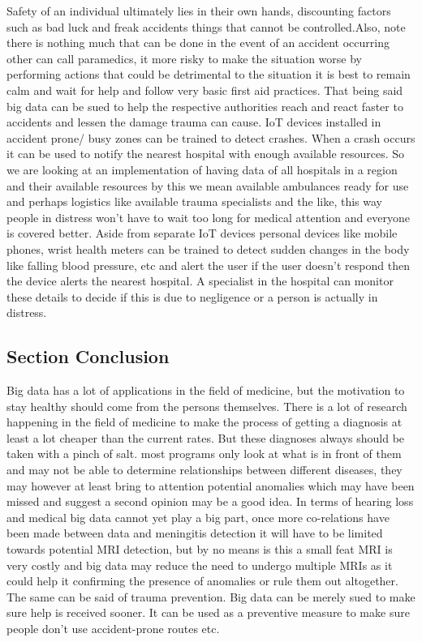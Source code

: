 \documentclass[sigconf]{acmart}
\begin{document}
Safety of an individual ultimately lies in their own hands, discounting factors such as bad luck and freak accidents things that cannot be controlled.Also, note there is nothing much that can be done in the event of an accident occurring other can call paramedics, it more risky to make the situation worse by performing actions that could be detrimental to the situation it is best to remain calm and wait for help and follow very basic first aid practices. That being said big data can be sued to help the respective authorities reach and react faster to accidents and lessen the damage trauma can cause. IoT devices installed in accident prone/ busy zones can be trained to detect crashes. When a crash occurs it can be used to notify the nearest hospital with enough available resources. So we are looking at an implementation of having data of all hospitals in a region and their available resources by this we mean available ambulances ready for use and perhaps logistics like available trauma specialists and the like, this way people in distress won't have to wait too long for medical attention and everyone is covered better. Aside from separate IoT devices personal devices like mobile phones, wrist health meters can be trained to detect sudden changes in the body like falling blood pressure, etc and alert the user if the user doesn't respond then the device alerts the nearest hospital. A specialist in the hospital can monitor these details to decide if this is due to negligence or a person is actually in distress.

\subsection{Section Conclusion}
Big data has a lot of applications in the field of medicine, but the motivation to stay healthy should come from the persons themselves. There is a lot of research happening in the field of medicine to make the process of getting a diagnosis at least a lot cheaper than the current rates. But these diagnoses always should be taken with a  pinch of salt. most programs only look at what is in front of them and may not be able to determine relationships between different diseases, they may however at least bring to attention potential anomalies which may have been missed and suggest a second opinion may be a good idea. In terms of hearing loss and medical big data cannot yet play a big part, once more co-relations have been made between data and meningitis detection it will have to be limited towards potential MRI detection, but by no means is this a small feat MRI is very costly and big data may reduce the need to undergo multiple MRIs as it could help it confirming the presence of anomalies or rule them out altogether. The same can be said of trauma prevention. Big data can be merely sued to make sure help is received sooner. It can be used as a preventive measure to make sure people don't use accident-prone routes etc.
\end{document}
